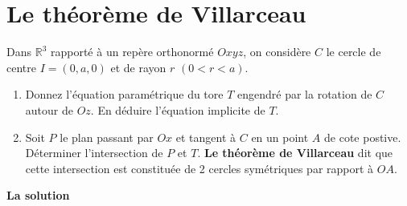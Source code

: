 \documentclass[a4paper,11pt]{book}
\newcommand{\R}{{\mathbb{R}}}
\begin{document}
\section{Le th\'eor\`eme de Villarceau}
Dans $\R^3$ rapport\'e \`a un rep\`ere orthonorm\'e $Oxyz$, on consid\`ere $C$ 
le cercle de centre $I=(0,a,0)$ et de rayon $r$ $(0<r<a)$.
\begin{enumerate}
\item Donnez l'\'equation param\'etrique du tore $T$ engendr\'e par la rotation
 de $C$ autour de $Oz$. En d\'eduire l'\'equation implicite de $T$.
\item Soit $P$ le plan passant par $Ox$ et tangent \`a $C$ en un point $A$ de 
cote postive. D\'eterminer l'intersection de $P$ et $T$.
{\bf Le th\'eor\`eme de Villarceau} dit que cette intersection est constitu\'ee 
de 2 cercles sym\'etriques par rapport \`a $OA$.
\end{enumerate}
{\bf La solution}
\end{document}
